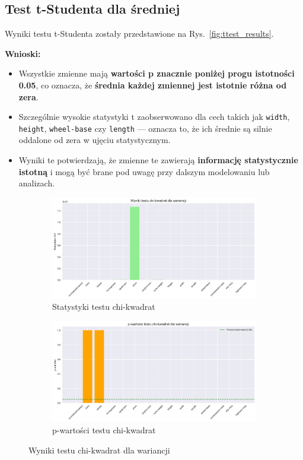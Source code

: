 \documentclass[12pt,a4paper]{article}
\begin{document}
\subsection{Test t-Studenta dla średniej}

Wyniki testu t-Studenta zostały przedstawione na Rys.~\ref{fig:ttest_results}.

\textbf{Wnioski:}

\begin{itemize}
    \item Wszystkie zmienne mają \textbf{wartości p znacznie poniżej progu istotności 0.05}, co oznacza, że \textbf{średnia każdej zmiennej jest istotnie różna od zera}.
    \item Szczególnie wysokie statystyki t zaobserwowano dla cech takich jak \texttt{width}, \texttt{height}, \texttt{wheel-base} czy \texttt{length} — oznacza to, że ich średnie są silnie oddalone od zera w ujęciu statystycznym.
    \item Wyniki te potwierdzają, że zmienne te zawierają \textbf{informację statystycznie istotną} i mogą być brane pod uwagę przy dalszym modelowaniu lub analizach.
\end{itemize}

\begin{figure}[H]
    \centering
    \begin{subfigure}[b]{0.48\textwidth}
        \includegraphics[width=\textwidth]{figures/chi2_statistics.png}
        \caption{Statystyki testu chi-kwadrat}
    \end{subfigure}
    \hfill
    \begin{subfigure}[b]{0.48\textwidth}
        \includegraphics[width=\textwidth]{figures/chi2_pvalues.png}
        \caption{p-wartości testu chi-kwadrat}
    \end{subfigure}
    \caption{Wyniki testu chi-kwadrat dla wariancji}
    \label{fig:chi2_results}
\end{figure}
\end{document}
